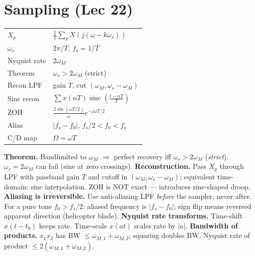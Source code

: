 \documentclass[11pt]{extarticle}
\DeclareMathOperator{\sinc}{sinc}
\begin{document}
\FloatBarrier
\bigskip

\section*{Sampling (Lec 22)}

\begin{table}
  \begin{tabular}{@{}l l@{}}
    \toprule
    $X_p$ & $\tfrac{1}{T}\!\sum_k X(j(\omega{-}k\omega_s))$ \\
    $\omega_s$ & $2\pi/T$, $f_s{=}1/T$ \\
    Nyquist rate & $2\omega_M$ \\
    Theorem & $\omega_s{>}2\omega_M$ (strict) \\
    Recon LPF & gain $T$, cut $(\omega_M,\omega_s{-}\omega_M)$ \\
    Sinc recon & $\sum x(nT)\sinc(\tfrac{t{-}nT}{T})$ \\
    ZOH & $\tfrac{2\sin(\omega T/2)}{\omega}e^{-j\omega T/2}$ \\
    Alias & $|f_s{-}f_0|$, $f_s/2{<}f_0{<}f_s$ \\
    C/D map & $\Omega{=}\omega T$ \\
    \bottomrule
  \end{tabular}
\end{table}
\textbf{Theorem.} Bandlimited to $\omega_M$ $\Rightarrow$ perfect recovery iff $\omega_s>2\omega_M$ (\emph{strict}). $\omega_s=2\omega_M$ can fail (sine at zero crossings).
\textbf{Reconstruction.} Pass $X_p$ through LPF with passband gain $T$ and cutoff in $(\omega_M,\omega_s{-}\omega_M)$; equivalent time-domain: sinc interpolation. ZOH is NOT exact --- introduces sinc-shaped droop.
\textbf{Aliasing is irreversible.} Use anti-aliasing LPF \emph{before} the sampler, never after. For a pure tone $f_0>f_s/2$: aliased frequency is $|f_s-f_0|$; sign flip means reversed apparent direction (helicopter blade).
\textbf{Nyquist rate transforms.} Time-shift $x(t-t_0)$ keeps rate. Time-scale $x(at)$ scales rate by $|a|$.
\textbf{Bandwidth of products.} $x_1 x_2$ has BW $\le \omega_{M,1}+\omega_{M,2}$; squaring doubles BW. Nyquist rate of product $\le 2(\omega_{M,1}+\omega_{M,2})$.

\FloatBarrier
\bigskip

\end{document}
